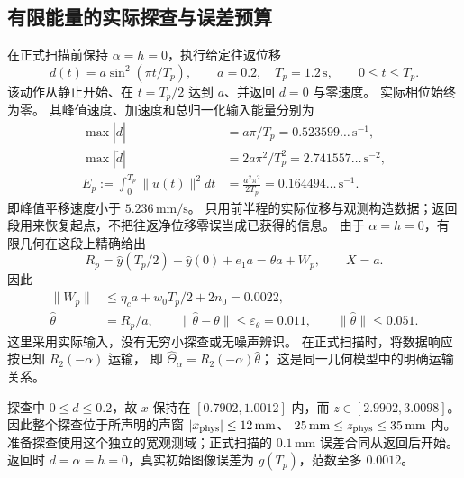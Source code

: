 \documentclass[11pt,a4paper]{article}
\numberwithin{equation}{section}
\theoremstyle{definition}
\begin{document}
\subsection{有限能量的实际探查与误差预算}
在正式扫描前保持 $\alpha=h=0$，执行给定往返位移
\begin{equation}
 d(t)=a\sin^2(\pi t/T_p),\qquad
 a=0.2,\quad T_p=1.2\,\mathrm{s},\qquad 0\le t\le T_p.
 \label{v44:eq:actual-probe-path}
\end{equation}
该动作从静止开始、在 $t=T_p/2$ 达到 $a$、并返回 $d=0$ 与零速度。
实际相位始终为零。
其峰值速度、加速度和总归一化输入能量分别为
\begin{align}
 \max|\dot d|&=a\pi/T_p=0.523599\ldots\,\mathrm{s}^{-1},\\
 \max|\ddot d|&=2a\pi^2/T_p^2=2.741557\ldots\,\mathrm{s}^{-2},\\
 E_p:=\int_0^{T_p}\|u(t)\|^2dt
 &=\frac{a^2\pi^2}{2T_p}=0.164494\ldots\,\mathrm{s}^{-1}.
 \label{v44:eq:actual-probe-energy}
\end{align}
即峰值平移速度小于 $5.236\,\mathrm{mm/s}$。
只用前半程的实际位移与观测构造数据；返回段用来恢复起点，不把往返净位移零误当成已获得的信息。
由于 $\alpha=h=0$，有限几何在这段上精确给出
\begin{equation}
 R_p=\widehat y(T_p/2)-\widehat y(0)+e_1a
       =\theta a+W_p,\qquad X=a.
\end{equation}
因此
\begin{align}
 \|W_p\|&\le\eta_ca+w_0T_p/2+2n_0=0.0022,\\
 \widehat\theta&=R_p/a,
 \qquad\|\widehat\theta-\theta\|\le\varepsilon_\theta=0.011,
 \qquad \|\widehat\theta\|\le0.051.
 \label{v44:eq:actual-probe-estimate}
\end{align}
这里采用实际输入，没有无穷小探查或无噪声辨识。
在正式扫描时，将数据响应按已知 $R_2(-\alpha)$ 运输，
即 $\widehat\Theta_\alpha=R_2(-\alpha)\widehat\theta$；
这是同一几何模型中的明确运输关系。

探查中 $0\le d\le0.2$，故 $x$ 保持在
$[0.7902,1.0012]$ 内，而 $z\in[2.9902,3.0098]$。
因此整个探查位于所声明的声窗 $|x_{\rm phys}|\le12\,\mathrm{mm}$、
$25\,\mathrm{mm}\le z_{\rm phys}\le35\,\mathrm{mm}$ 内。
准备探查使用这个独立的宽观测域；正式扫描的 $0.1\,\mathrm{mm}$ 误差合同从返回后开始。
返回时 $d=\alpha=h=0$，真实初始图像误差为 $g(T_p)$，范数至多 $0.0012$。
\end{document}
